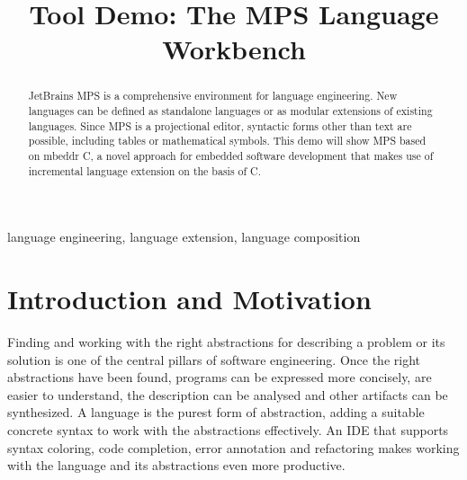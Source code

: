 \documentclass[10pt, conference, compsocconf]{IEEEtran}
\begin{document}
%
\title{Tool Demo: The MPS Language Workbench}

 

\author{
\and
{}
}

\newcommand{\changefont}[3]{\fontfamily{#1}\fontseries{#2}\fontshape{#3}\selectfont}

\newcommand\todo[1]{\mynote{TODO}{#1}} 
\newcommand{\fig}[1]{Fig.~\ref{#1}}
\newcommand{\sect}[1]{Section~\ref{#1}}
\newcommand{\ic}[1]{\changefont{cmtt}{m}{n}{#1}\normalfont}  %
\newcommand{\lcr}[1]{\changefont{cmtt}{m}{n}{#1}\normalfont} %

\newcommand{\pp}[1]{ \vspace{2mm}\noindent\textbf{{#1}} }


\maketitle


\begin{abstract}
JetBrains MPS is a comprehensive environment for language engineering.
New languages can be defined as standalone languages or as modular extensions of
existing languages. Since MPS is a projectional editor, syntactic forms other
than text are possible, including tables or mathematical symbols. This
demo will show MPS based on mbeddr C, a novel approach for embedded software
development that makes use of incremental language extension on the basis of C.
\end{abstract}

\begin{IEEEkeywords}
language engineering, language extension, language composition
\end{IEEEkeywords}

\section{Introduction and Motivation}

\noindent
Finding and working with the right abstractions for describing a
problem or its solution is one of the central pillars of software engineering.
Once the right abstractions have been found, programs can be expressed more
concisely, are easier to understand, the description can be analysed and other
artifacts can be synthesized. A language is the purest form of abstraction,
adding a suitable concrete syntax to work with the abstractions effectively. An
IDE that supports syntax coloring, code completion, error annotation and
refactoring makes working with the language and its abstractions even more
productive.
\end{document}

